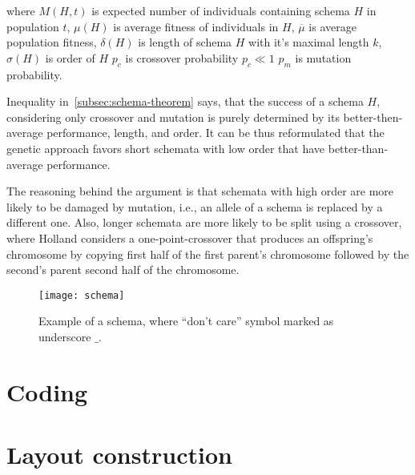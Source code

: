 where $M(H, t)$ is expected number of individuals containing schema $H$ in population $t$,
$\mu(H)$ is average fitness of individuals in $H$,
$\overline{\mu}$ is average population fitness,
$\delta(H)$ is length of schema $H$ with it’s maximal length $k$,
$\sigma(H)$ is order of $H$
$p_c$ is crossover probability $p_c \ll 1$
$p_m$ is mutation probability.

Inequality in~\ref{subsec:schema-theorem} says, that the success of a schema $H$,
considering only crossover and mutation is purely determined
by its better-then-average performance, length, and order.
It can be thus reformulated that the genetic approach favors
short schemata with low order that have better-than-average performance.

The reasoning behind the argument is that schemata with high order are more likely
to be damaged by mutation, i.e., an allele of a schema is replaced by a different one.
Also, longer schemata are more likely to be split using a crossover, where Holland
considers a one-point-crossover that produces an offspring’s chromosome by copying
first half of the first parent’s chromosome followed by the second’s parent second half of the chromosome.

\begin{figure}[h]
    \texttt{[image: schema]}
    \caption[Example of a schema]{Example of a schema, where “don’t care” symbol marked as underscore $\_$.}
    \label{fig:schema}
\end{figure}


\section{Coding}\label{sec:coding}


\section{Layout construction}\label{sec:layout-construction}

